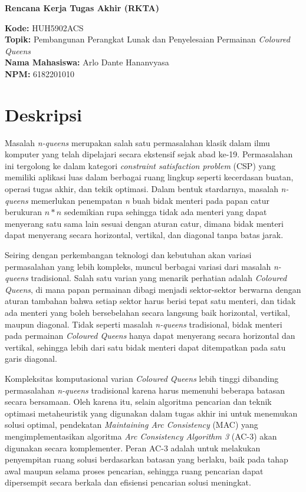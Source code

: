 \documentclass[12pt,a4paper]{article}
\begin{document}
	
	\begin{center}
		\Large \textbf{Rencana Kerja Tugas Akhir (RKTA)} \\
		\vspace{0.5cm}
	\end{center}
	
	\noindent \textbf{Kode:} HUH5902ACS \\[0.3cm]
	\noindent \textbf{Topik:} Pembangunan Perangkat Lunak dan Penyelesaian Permainan \textit{Coloured Queens} \\[0.3cm]
	\noindent \textbf{Nama Mahasiswa:} Arlo Dante Hananvyasa \\[0.3cm]
	\noindent \textbf{NPM:} 6182201010 \\[0.8cm]

	\section*{Deskripsi}
	Masalah \textit{n-queens} merupakan salah satu permasalahan klasik dalam ilmu komputer yang telah dipelajari secara ekstensif sejak abad ke-19. Permasalahan ini tergolong ke dalam kategori \textit{constraint satisfaction problem} (CSP) yang memiliki aplikasi luas dalam berbagai ruang lingkup seperti kecerdasan buatan, operasi tugas akhir, dan tekik optimasi. Dalam bentuk stardarnya, masalah \textit{n-queens} memerlukan penempatan \textit{n} buah bidak menteri pada papan catur berukuran $n*n$ sedemikian rupa sehingga tidak ada menteri yang dapat menyerang satu sama lain sesuai dengan aturan catur, dimana bidak menteri dapat menyerang secara horizontal, vertikal, dan diagonal tanpa batas jarak.
	
	Seiring dengan perkembangan teknologi dan kebutuhan akan variasi permasalahan yang lebih kompleks, muncul berbagai variasi dari masalah \textit{n-queens} tradisional. Salah satu varian yang menarik perhatian adalah \textit{Coloured Queens}, di mana papan permainan dibagi menjadi sektor-sektor berwarna dengan aturan tambahan bahwa setiap sektor harus berisi tepat satu menteri, dan tidak ada menteri yang boleh bersebelahan secara langsung baik horizontal, vertikal, maupun diagonal. Tidak seperti masalah \textit{n-queens} tradisional, bidak menteri pada permainan \textit{Coloured Queens} hanya dapat menyerang secara horizontal dan vertikal, sehingga lebih dari satu bidak menteri dapat ditempatkan pada satu garis diagonal.
	
	Kompleksitas komputasional varian \textit{Coloured Queens} lebih tinggi dibanding permasalahan \textit{n-queens} tradisional karena harus memenuhi beberapa batasan secara bersamaan. Oleh karena itu, selain algoritma pencarian dan teknik optimasi metaheuristik yang digunakan dalam tugas akhir ini untuk menemukan solusi optimal, pendekatan \textit{ Maintaining Arc Consistency} (MAC) yang mengimplementasikan algoritma \textit{Arc Consistency Algorithm 3} (AC-3) akan digunakan secara komplementer. Peran AC-3 adalah untuk melakukan penyempitan ruang solusi berdasarkan batasan yang berlaku, baik pada tahap awal maupun selama proses pencarian, sehingga ruang pencarian dapat dipersempit secara berkala dan efisiensi pencarian solusi meningkat.
	
\end{document}

